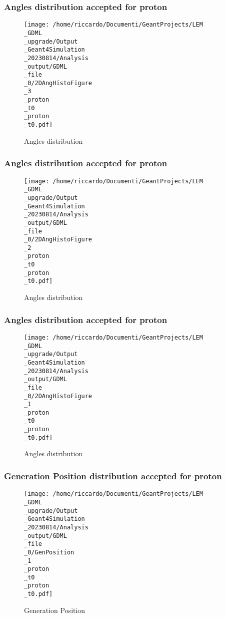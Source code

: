 \documentclass[8pt]{beamer}
\begin{document}
            \begin{frame}
                \frametitle{Angles distribution accepted for proton}
            
        \begin{figure}[h]
            \centering
            \texttt{[image: /home/riccardo/Documenti/GeantProjects/LEM\\\_GDML\\\_upgrade/Output\\\_Geant4Simulation\\\_20230814/Analysis\\\_output/GDML\\\_file\\\_0/2DAngHistoFigure\\\_3\\\_proton\\\_t0\\\_proton\\\_t0.pdf]}
            \caption{Angles distribution}
        \end{figure}
        
            \end{frame}
            
            \begin{frame}
                \frametitle{Angles distribution accepted for proton}
            
        \begin{figure}[h]
            \centering
            \texttt{[image: /home/riccardo/Documenti/GeantProjects/LEM\\\_GDML\\\_upgrade/Output\\\_Geant4Simulation\\\_20230814/Analysis\\\_output/GDML\\\_file\\\_0/2DAngHistoFigure\\\_2\\\_proton\\\_t0\\\_proton\\\_t0.pdf]}
            \caption{Angles distribution}
        \end{figure}
        
            \end{frame}
            
            \begin{frame}
                \frametitle{Angles distribution accepted for proton}
            
        \begin{figure}[h]
            \centering
            \texttt{[image: /home/riccardo/Documenti/GeantProjects/LEM\\\_GDML\\\_upgrade/Output\\\_Geant4Simulation\\\_20230814/Analysis\\\_output/GDML\\\_file\\\_0/2DAngHistoFigure\\\_1\\\_proton\\\_t0\\\_proton\\\_t0.pdf]}
            \caption{Angles distribution}
        \end{figure}
        
            \end{frame}
            
            \begin{frame}
                \frametitle{Generation Position distribution accepted for proton}
            
        \begin{figure}[h]
            \centering
            \texttt{[image: /home/riccardo/Documenti/GeantProjects/LEM\\\_GDML\\\_upgrade/Output\\\_Geant4Simulation\\\_20230814/Analysis\\\_output/GDML\\\_file\\\_0/GenPosition\\\_1\\\_proton\\\_t0\\\_proton\\\_t0.pdf]}
            \caption{Generation Position}
        \end{figure}
        
            \end{frame}
            
\end{document}
